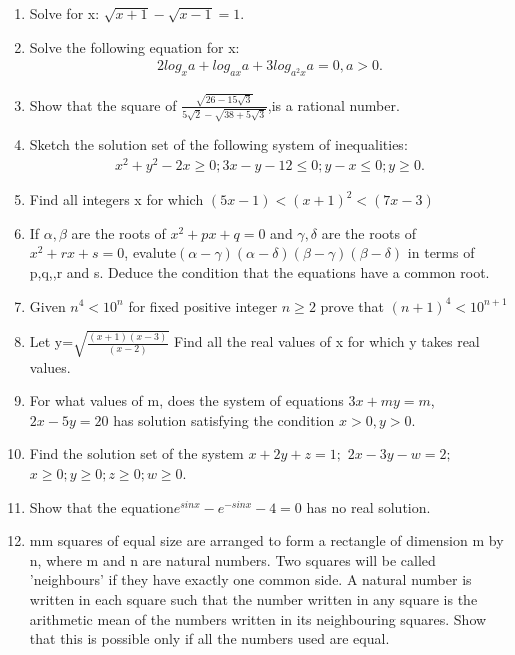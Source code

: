 \documentclass[journal,12pt,twocolumn]{IEEEtran}
\begin{document}
\begin{enumerate}[label=\arabic*]
\item Solve for x: $\sqrt{x+1}-\sqrt{x-1}=1$.

\item Solve the following equation for x:
\begin{align} 
2log_{x} a+log_{ax} a+3log_{a^2{x}} a=0, a>0.
\end{align}
\item Show that the square of $\frac{\sqrt{26-15\sqrt{3}}}{5\sqrt{2}-\sqrt{38+5\sqrt{3}}}$,is a rational number.

\item Sketch the solution set of the following system of inequalities: 
\begin{align}
x^{2}+y^{2}-2x\geq0;3x-y-12\leq0;y-x\leq0;y\geq0.
\end{align}

\item Find all integers x for which $(5x-1)<(x+1)^2<(7x-3)$

\item If $\alpha,\beta$ are the roots of $x^2+px+q=0$ and $\gamma,\delta$ are the roots of $x^2+rx+s=0$, evalute$(\alpha-\gamma)(\alpha-\delta)(\beta-\gamma)(\beta-\delta)$ in terms of p,q,,r and s. Deduce the condition that the equations have a common root.

\item Given $n^4<10^n$ for fixed positive integer $n\geq2$ prove that $(n+1)^4<10^{n+1}$

\item Let y=$\sqrt{\frac{(x+1)(x-3)}{(x-2)}}$ Find all the real values of x for which y takes real values.

\item For what values of m, does the system of equations $3x+my=m$,$2x-5y=20$ has solution satisfying the condition $x>0,y>0$.

\item Find the solution set of the system $x+2y+z=1;$ $2x-3y-w=2;$ $x\geq0;y\geq0;z\geq0;w\geq0$.

\item Show that the equation$e^{sinx}-e^{-sinx}-4=0$ has no real solution.

\item mm squares of equal size are arranged to form a rectangle of dimension m by n, where m and n are natural numbers. Two squares will be called 'neighbours' if they have exactly one common side. A natural number is written in each square such that the number written in any square is the arithmetic mean of the numbers written in its neighbouring squares. Show that this is possible only if all the numbers used are equal.


\end{enumerate}
\end{document}
